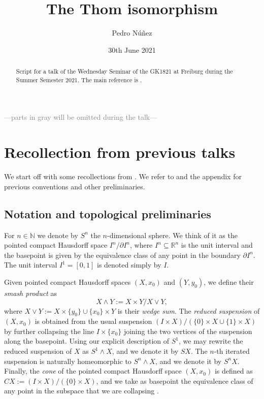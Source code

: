 \documentclass[12pt,a4paper]{amsart}
\title[The Thom isomorphism]{The Thom isomorphism}
\author[Pedro N\'{u}\~{n}ez]{Pedro N\'{u}\~{n}ez}
\date{30th June 2021}
\theoremstyle{plain}
\theoremstyle{definition}
\theoremstyle{remark}
\begin{document}
\maketitle

\begin{abstract}
  Script for a talk of the Wednesday Seminar of the GK1821 at Freiburg during the Summer Semester 2021.
  The main reference is \cite[\S 2]{ati67}.
\end{abstract}

\tableofcontents

\begin{center}
  \textcolor{gray}{---parts in gray will be omitted during the talk---}
\end{center}

\section{Recollection from previous talks}

We start off with some recollections from \cite[\S 2]{ati67}.
We refer to \cite{ati67} and the appendix for previous conventions and other preliminaries.

\subsection{Notation and topological preliminaries}

For $n \in \mathbb{N}$ we denote by $S^{n}$ the $n$-dimensional sphere.
We think of it as the pointed compact Hausdorff space $I^{n}/\partial I^{n}$, where $I^{n} \subseteq \mathbb{R}^{n}$ is the unit interval and the basepoint is given by the equivalence class of any point in the boundary $\partial I^{n}$.
The unit interval $I^{1} = [0,1]$ is denoted simply by $I$.

Given pointed compact Hausdorff spaces $(X,x_{0})$ and $(Y,y_{0})$, we define their \textit{smash product} as
\[ X \wedge Y := X \times Y / X \vee Y, \]
where $X \vee Y := X \times \{y_{0}\} \cup \{ x_{0}\} \times Y$ is their \textit{wedge sum}.
The \textit{reduced suspension} of $(X,x_{0})$ is obtained from the usual suspension $(I\times X)/(\{0\}\times X \cup \{1\} \times X)$ by further collapsing the line $I \times \{ x_{0} \}$ joining the two vertices of the suspension along the basepoint.
Using our explicit description of $S^{1}$, we may rewrite the reduced suspension of $X$ as $S^{1} \wedge X$, and we denote it by $SX$.
The $n$-th iterated suspension is naturally homeomorphic to $S^{n} \wedge X$, and we denote it by $S^{n}X$.
Finally, the \textit{cone} of the pointed compact Hausdorff space $(X,x_{0})$ is defined as $CX := (I \times X )/ (\{0 \} \times X)$, and we take as basepoint the equivalence class of any point in the subspace that we are collapsing \cite[p.~68]{ati67}.
\end{document}
